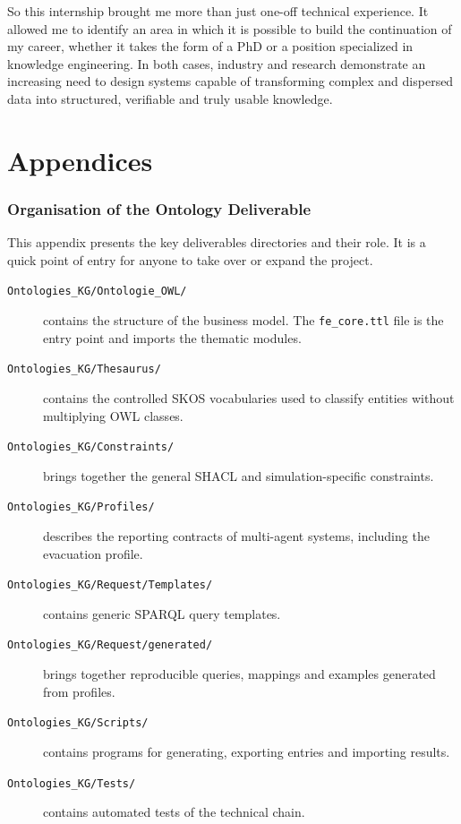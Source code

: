 \documentclass{article}
\begin{document}
So this internship brought me more than just one-off technical experience. It allowed me to identify an area in which it is possible to build the continuation of my career, whether it takes the form of a PhD or a position specialized in knowledge engineering. In both cases, industry and research demonstrate an increasing need to design systems capable of transforming complex and dispersed data into structured, verifiable and truly usable knowledge.

\clearpage
\appendix

\part*{Appendices}
\clearpage

\section{Organisation of the Ontology Deliverable}

This appendix presents the key deliverables directories and their role. It is a quick point of entry for anyone to take over or expand the project.

\begin{description}
\item[\texttt{Ontologies\_KG/Ontologie\_OWL/}] contains the structure of the business model. The \texttt{fe\_core.ttl} file is the entry point and imports the thematic modules.
\item[\texttt{Ontologies\_KG/Thesaurus/}] contains the controlled SKOS vocabularies used to classify entities without multiplying OWL classes.
\item[\texttt{Ontologies\_KG/Constraints/}] brings together the general SHACL and simulation-specific constraints.
\item[\texttt{Ontologies\_KG/Profiles/}] describes the reporting contracts of multi-agent systems, including the evacuation profile.
\item[\texttt{Ontologies\_KG/Request/Templates/}] contains generic SPARQL query templates.
\item[\texttt{Ontologies\_KG/Request/generated/}] brings together reproducible queries, mappings and examples generated from profiles.
\item[\texttt{Ontologies\_KG/Scripts/}] contains programs for generating, exporting entries and importing results.
\item[\texttt{Ontologies\_KG/Tests/}] contains automated tests of the technical chain.
\end{description}
\end{document}
